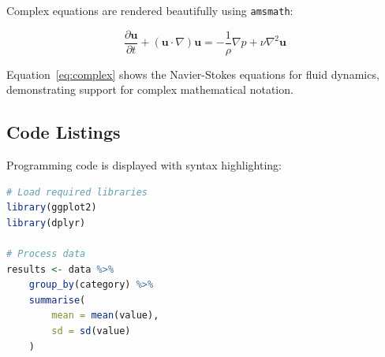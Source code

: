 Complex equations are rendered beautifully using \texttt{amsmath}:

\begin{equation}\label{eq:complex}
\frac{\partial \mathbf{u}}{\partial t} + (\mathbf{u} \cdot \nabla) \mathbf{u} = -\frac{1}{\rho} \nabla p + \nu \nabla^2 \mathbf{u}
\end{equation}

\begin{note}
Equation~\ref{eq:complex} shows the Navier-Stokes equations for fluid dynamics, demonstrating support for complex mathematical notation.
\end{note}

\subsection{Code Listings}

Programming code is displayed with syntax highlighting:

\begin{code}
\begin{lstlisting}[language=R, caption={R code for statistical analysis}]
# Load required libraries
library(ggplot2)
library(dplyr)

# Process data
results <- data %>%
    group_by(category) %>%
    summarise(
        mean = mean(value),
        sd = sd(value)
    )
\end{lstlisting}
\label{code:analysis}
\end{code}